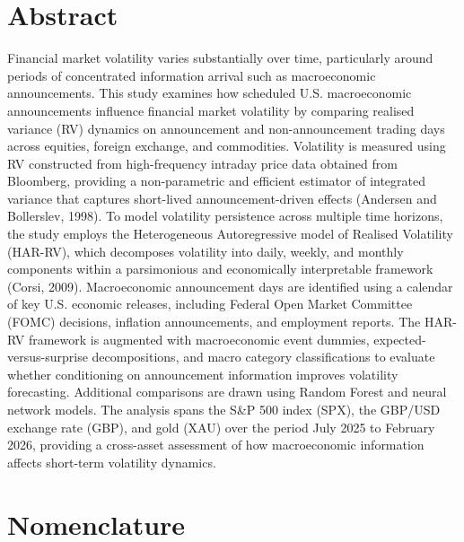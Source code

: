 \documentclass[12pt,a4paper]{report}
\begin{document}
\chapter*{Abstract}
Financial market volatility varies substantially over time, particularly around periods of concentrated information arrival such as macroeconomic announcements. This study examines how scheduled U.S. macroeconomic announcements influence financial market volatility by comparing realised variance (RV) dynamics on announcement and non-announcement trading days across equities, foreign exchange, and commodities. Volatility is measured using RV constructed from high-frequency intraday price data obtained from Bloomberg, providing a non-parametric and efficient estimator of integrated variance that captures short-lived announcement-driven effects (Andersen and Bollerslev, 1998). To model volatility persistence across multiple time horizons, the study employs the Heterogeneous Autoregressive model of Realised Volatility (HAR-RV), which decomposes volatility into daily, weekly, and monthly components within a parsimonious and economically interpretable framework (Corsi, 2009). Macroeconomic announcement days are identified using a calendar of key U.S. economic releases, including Federal Open Market Committee (FOMC) decisions, inflation announcements, and employment reports. The HAR-RV framework is augmented with macroeconomic event dummies, expected-versus-surprise decompositions, and macro category classifications to evaluate whether conditioning on announcement information improves volatility forecasting. Additional comparisons are drawn using Random Forest and neural network models. The analysis spans the S\&P 500 index (SPX), the GBP/USD exchange rate (GBP), and gold (XAU) over the period July 2025 to February 2026, providing a cross-asset assessment of how macroeconomic information affects short-term volatility dynamics.

\chapter*{Nomenclature}
\end{document}
